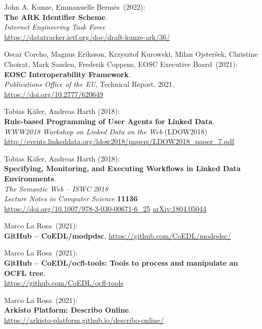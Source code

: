 \begin{thebibliography}{9}
John A. Kunze, Emmanuelle Bermès~(2022): \\
\textbf{{The ARK Identifier Scheme}}.\\
\emph{Internet Engineering Task Force}\\
\url{https://datatracker.ietf.org/doc/draft-kunze-ark/36/}

Oscar Corcho, Magnus Eriksson, Krzysztof Kurowski, Milan Ojsteršek,
Christine Choirat, Mark Sanden, Frederik Coppens, EOSC Executive
Board~(2021): \\
\textbf{EOSC Interoperability Framework}.\\
\emph{Publications Office of the EU}, Technical Report, 2021.\\
\url{https://doi.org/10.2777/620649}

Tobias Käfer, Andreas Harth (2018): \\
\textbf{Rule-based Programming of User Agents for Linked Data}.\\
\emph{WWW2018 Workshop on Linked Data on the Web} (LDOW2018) \\
\url{http://events.linkeddata.org/ldow2018/papers/LDOW2018_paper_7.pdf}

Tobias Käfer, Andreas Harth (2018):\\
\textbf{Specifying, Monitoring, and Executing Workflows in Linked Data Environments}.\\
\emph{The Semantic Web – ISWC 2018}\\
\emph{Lecture Notes in Computer Science} \textbf{11136}\\
\url{https://doi.org/10.1007/978-3-030-00671-6_25}
\href{https://arxiv.org/abs/1804.05044}{arXiv:1804.05044}

Marco La Rosa~(2021): \\
\textbf{GitHub -- CoEDL/modpdsc},
\url{https://github.com/CoEDL/modpdsc/}

Marco La Rosa~(2021): \\
\textbf{GitHub -- CoEDL/ocfl-tools: Tools to process and manipulate an OCFL tree}.\\
\url{https://github.com/CoEDL/ocfl-tools}

Marco La Rosa~(2021): \\
\textbf{Arkisto Platform: Describo Online}.\\
\url{https://arkisto-platform.github.io/describo-online/}


\end{thebibliography}
